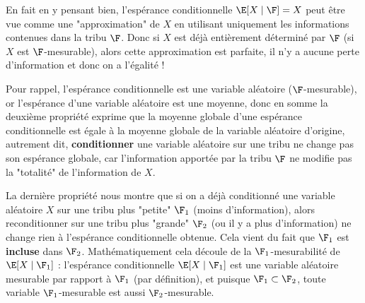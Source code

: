     \bn
    En fait en y pensant bien, l'espérance conditionnelle $\E[X\mid \F] = X$ peut être vue comme une "approximation" de $X$ en utilisant uniquement les informations contenues dans la tribu $\F$. Donc si $X$ est déjà entièrement déterminé par $\F$ (\ie si $X$ est $\F$-mesurable), alors cette approximation est parfaite, il n'y a aucune perte d'information et donc on a l'égalité ! 
    \en
    \item Pour rappel, l'espérance conditionnelle est une variable aléatoire ($\F$-mesurable), or l'espérance d'une variable aléatoire est une moyenne, donc en somme la deuxième propriété exprime que la moyenne globale d'une espérance conditionnelle est égale à la moyenne globale de la variable aléatoire d'origine, autrement dit, \textbf{conditionner} une variable aléatoire sur une tribu ne change pas son espérance globale, car l'information apportée par la tribu $\F$ ne modifie pas la "totalité" de l'information de $X$.
    \item La dernière propriété nous montre que si on a déjà conditionné une variable aléatoire $X$ sur une tribu plus "petite" $\F_1$ (\ie moins d'information), alors reconditionner sur une tribu plus "grande" $\F_2$ (\ie ou il y a plus d'information) ne change rien à l'espérance conditionnelle obtenue. Cela vient du fait que $\F_1$ est \textbf{incluse} dans $\F_2$. Mathématiquement cela découle de la $\F_1$-mesurabilité de $\E[X \mid \F_1]$ : l'espérance conditionnelle $\E[X \mid \F_1]$ est une variable aléatoire mesurable par rapport à $\F_1$ (par définition), et puisque $\F_1 \subset \F_2$, toute variable $\F_1$-mesurable est aussi $\F_2$-mesurable.
\een
\epf
    
    
    
    
    
    
    
    
    
    
    

